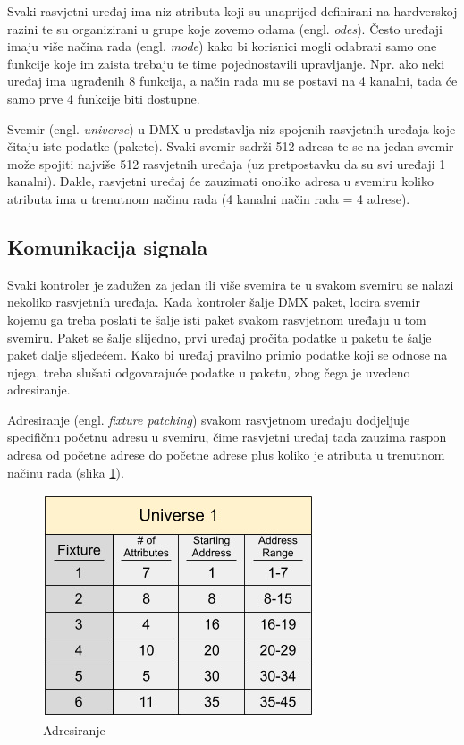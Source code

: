 \documentclass[times, utf8, zavrsni, numeric]{fer}
\begin{document}
Svaki rasvjetni uređaj ima niz atributa koji su unaprijed definirani na hardverskoj razini te su organizirani u grupe koje zovemo odama (engl. \emph{odes}). Često uređaji imaju više načina rada (engl. \emph{mode}) kako bi korisnici mogli odabrati samo one funkcije koje im zaista trebaju te time pojednostavili upravljanje. Npr. ako neki uređaj ima ugrađenih 8 funkcija, a način rada mu se postavi na 4 kanalni, tada će samo prve 4 funkcije biti dostupne. \newline

Svemir (engl. \emph{universe}) u DMX-u predstavlja niz spojenih rasvjetnih uređaja koje čitaju iste podatke (pakete). Svaki svemir sadrži 512 adresa te se na jedan svemir može spojiti najviše 512 rasvjetnih uređaja (uz pretpostavku da su svi uređaji 1 kanalni). Dakle, rasvjetni uređaj će zauzimati onoliko adresa u svemiru koliko atributa ima u trenutnom načinu rada (4 kanalni način rada = 4 adrese).

\subsection{Komunikacija signala}
Svaki kontroler je zadužen za jedan ili više svemira te u svakom svemiru se nalazi nekoliko rasvjetnih uređaja. Kada kontroler šalje DMX paket, locira svemir kojemu ga treba poslati te šalje isti paket svakom rasvjetnom uređaju u tom svemiru. Paket se šalje slijedno, prvi uređaj pročita podatke u paketu te šalje paket dalje sljedećem. Kako bi uređaj pravilno primio podatke koji se odnose na njega, treba slušati odgovarajuće podatke u paketu, zbog čega je uvedeno adresiranje. \newline

Adresiranje (engl. \emph{fixture patching}) svakom rasvjetnom uređaju dodjeljuje specifičnu početnu adresu u svemiru, čime rasvjetni uređaj tada zauzima raspon adresa od početne adrese do početne adrese plus koliko je atributa u trenutnom načinu rada (slika \ref{fig:slika 3-2}).

\begin{figure}[htp]
	\centering
	\includegraphics[width=\linewidth]{slika 3-2.png}
	\caption{Adresiranje \cite{dmx_overview}}
	\label{fig:slika 3-2}
\end{figure}
\end{document}
